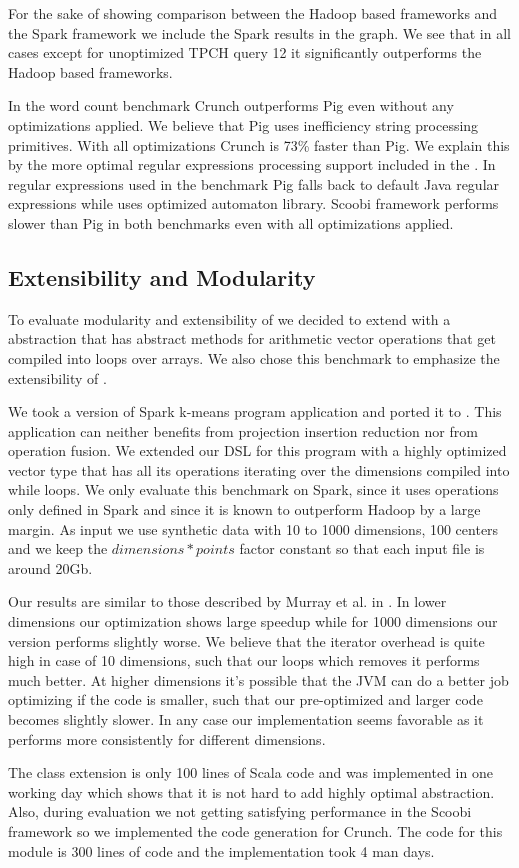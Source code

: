 For the sake of showing comparison between the Hadoop based frameworks and the
Spark framework we include the Spark results in the graph. We see that in all
cases except for unoptimized TPCH query 12 it significantly outperforms the
Hadoop based frameworks.

In the word count benchmark Crunch outperforms Pig even without any
optimizations applied. We believe that Pig uses inefficiency string processing
primitives. With all optimizations Crunch is 73\% faster than Pig. We explain
this by the more optimal regular expressions processing support included in the
\tool. In regular expressions used in the benchmark Pig falls back to default
Java regular expressions while \tool uses optimized automaton library. Scoobi
framework performs slower than Pig in both benchmarks even with all
optimizations applied.


\subsection{Extensibility and Modularity}
\label{subsec:kmeans}

To evaluate modularity and extensibility of \tool we decided to extend with a
 abstraction that has abstract methods for arithmetic vector
operations that get compiled into loops over arrays. We also chose this
benchmark to emphasize the extensibility of \tool.

We took a version of Spark k-means program \cite{spark-nsdi} application and
ported it to \tool. This application can neither benefits from projection
insertion reduction nor from operation fusion. We extended our DSL for this
program with a highly optimized vector type that has all its operations
iterating over the dimensions compiled into while loops. We only evaluate this
benchmark on Spark, since it uses operations only defined in Spark and since it
is known to outperform Hadoop by a large margin. As input we use synthetic data
with 10 to 1000 dimensions, 100 centers and we keep the $dimensions * points$
factor constant so that each input file is around 20Gb.

Our results are similar to those described by Murray et al. in
\cite{murray_steno:_2011}. In lower dimensions our optimization shows large
speedup while for 1000 dimensions our version performs slightly worse. We
believe that the iterator overhead is quite high in case of 10 dimensions, such
that our loops which removes it performs much better. At higher dimensions it's
possible that the JVM can do a better job optimizing if the code is smaller,
such that our pre-optimized and larger code becomes slightly slower. In any case
our implementation seems favorable as it performs more consistently for
different dimensions.

The  class extension is only 100 lines of Scala code and was
implemented in one working day which shows that it is not hard to add highly
optimal abstraction. Also, during evaluation we not getting satisfying
performance in the Scoobi framework so we implemented the code generation for
Crunch. The code for this module is 300 lines of code and the implementation
took 4 man days.
